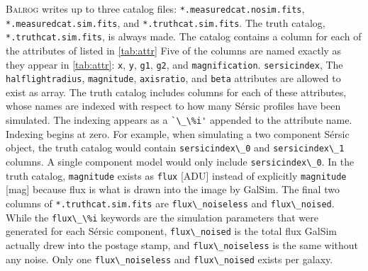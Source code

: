 \documentclass[12pt]{book}
\newcommand{\codett}[1]{\lstinline{#1}}
\newcommand{\galsim}{GalSim}
\newcommand{\balrog}{\textsc{Balrog}}
\newcommand{\sersic}{S\'{e}rsic}
\begin{document}
\balrog{} writes up to three catalog files:
\codett{*.measuredcat.nosim.fits}, \codett{*.measuredcat.sim.fits}, and \codett{*.truthcat.sim.fits}.
The truth catalog, \codett{*.truthcat.sim.fits}, is always made.
The catalog contains a column for each of the attributes of listed in \autoref{tab:attr}
Five of the columns are named exactly as they appear in \autoref{tab:attr}: 
\codett{x}, \codett{y}, \codett{g1}, \codett{g2}, and \codett{magnification}.
\codett{sersicindex}, The \codett{halflightradius}, \codett{magnitude}, \codett{axisratio}, and \codett{beta}
attributes are allowed to exist as array. The truth catalog includes columns for each of these attributes, whose names
are indexed with respect to how many \sersic{} profiles have been simulated.
The indexing appears as a \codett{`\_\%i'} appended to the attribute name.
Indexing begins at zero.
For example, when simulating a two component \sersic{} object, the truth catalog
would contain \codett{sersicindex\_0} and \codett{sersicindex\_1} columns.
A single component model would only include \codett{sersicindex\_0}.
In the truth catalog, \codett{magnitude} exists as \codett{flux} [ADU] instead
of explicitly \codett{magnitude} [mag] because flux is what is drawn into the image by \galsim{}.
The final two columns of \codett{*.truthcat.sim.fits} are \codett{flux\_noiseless} and \codett{flux\_noised}.
While the \codett{flux\_\%i} keywords are the simulation parameters that were generated for each \sersic{} component,
\codett{flux\_noised} is the total flux \galsim{} actually drew into the postage stamp,
and \codett{flux\_noiseless} is the same without any noise.
Only one \codett{flux\_noiseless} and \codett{flux\_noised} exists per galaxy.
\end{document}
